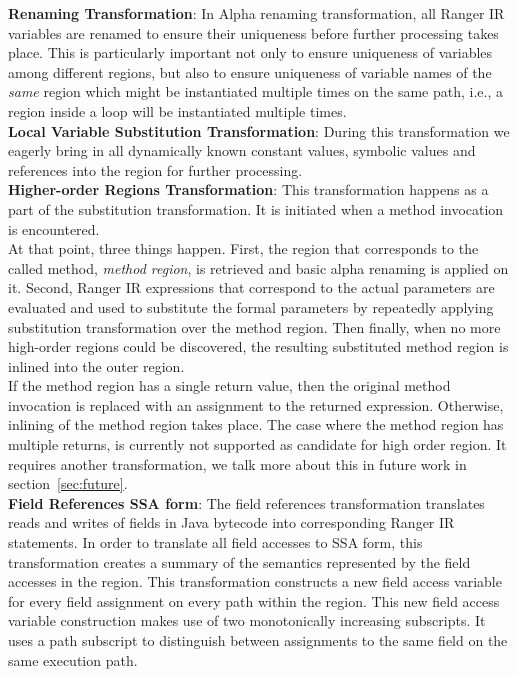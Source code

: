 \textbf{Renaming Transformation}: In Alpha renaming transformation, all Ranger IR variables are renamed to ensure their uniqueness before further processing takes place. 
%
This is particularly important not only to ensure uniqueness of variables among different regions, but also to ensure uniqueness of variable names of the \textit{same} region which might be instantiated multiple times on the same path, i.e., a region inside a loop will be instantiated multiple times.\\
%
\textbf{Local Variable Substitution Transformation}: During this transformation we eagerly bring in all dynamically known constant values, symbolic values and references into the region for further processing. \\
%
\textbf{Higher-order Regions Transformation}: This transformation happens as a part of the substitution transformation.
%
It is initiated when a method invocation is encountered.\\
%
At that point, three things happen.
%
First, the region that corresponds to the called method, \textit{method region}, is retrieved and basic alpha renaming is applied on it.
%
Second, Ranger IR expressions that correspond to the actual parameters are evaluated and used to substitute the formal parameters by repeatedly applying substitution transformation over the method region.
%
Then finally, when no more high-order regions could be discovered, the resulting substituted method region is inlined into the outer region.\\
%
If the method region has a single return value, then the original method invocation is replaced with an assignment to the returned expression.
%
Otherwise, inlining of the method region takes place.
%
The case where the method region has multiple returns, is currently not supported as candidate for high order region.
%
It requires another transformation, we talk more about this in future work in section~\ref{sec:future}.
\\
\textbf{Field References SSA form}: The field references transformation translates reads and writes of fields
in Java bytecode into corresponding Ranger IR statements.
%
In order to translate all field accesses to SSA form, this transformation creates a summary of the semantics
represented by the field accesses in the region.
%
This transformation constructs a new field access variable for every field assignment on every path within the region.
%
This new field access variable construction makes use of two monotonically increasing subscripts.
%
It uses a path subscript to distinguish between assignments to the same field on the same execution path.
